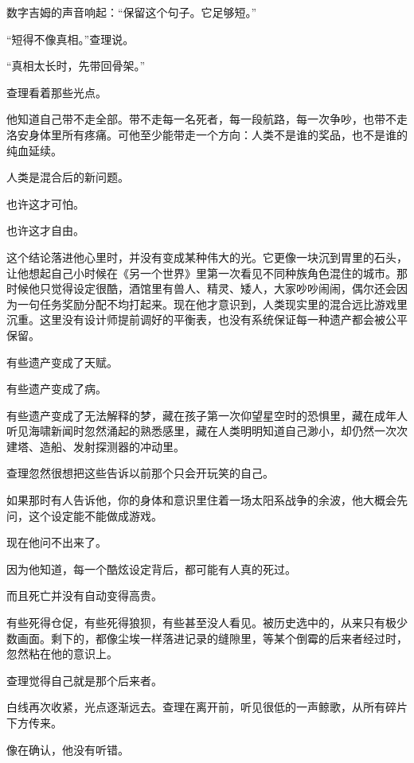 数字吉姆的声音响起：“保留这个句子。它足够短。”

“短得不像真相。”查理说。

“真相太长时，先带回骨架。”

查理看着那些光点。

他知道自己带不走全部。带不走每一名死者，每一段航路，每一次争吵，也带不走洛安身体里所有疼痛。可他至少能带走一个方向：人类不是谁的奖品，也不是谁的纯血延续。

人类是混合后的新问题。

也许这才可怕。

也许这才自由。

这个结论落进他心里时，并没有变成某种伟大的光。它更像一块沉到胃里的石头，让他想起自己小时候在《另一个世界》里第一次看见不同种族角色混住的城市。那时候他只觉得设定很酷，酒馆里有兽人、精灵、矮人，大家吵吵闹闹，偶尔还会因为一句任务奖励分配不均打起来。现在他才意识到，人类现实里的混合远比游戏里沉重。这里没有设计师提前调好的平衡表，也没有系统保证每一种遗产都会被公平保留。

有些遗产变成了天赋。

有些遗产变成了病。

有些遗产变成了无法解释的梦，藏在孩子第一次仰望星空时的恐惧里，藏在成年人听见海啸新闻时忽然涌起的熟悉感里，藏在人类明明知道自己渺小，却仍然一次次建塔、造船、发射探测器的冲动里。

查理忽然很想把这些告诉以前那个只会开玩笑的自己。

如果那时有人告诉他，你的身体和意识里住着一场太阳系战争的余波，他大概会先问，这个设定能不能做成游戏。

现在他问不出来了。

因为他知道，每一个酷炫设定背后，都可能有人真的死过。

而且死亡并没有自动变得高贵。

有些死得仓促，有些死得狼狈，有些甚至没人看见。被历史选中的，从来只有极少数画面。剩下的，都像尘埃一样落进记录的缝隙里，等某个倒霉的后来者经过时，忽然粘在他的意识上。

查理觉得自己就是那个后来者。

白线再次收紧，光点逐渐远去。查理在离开前，听见很低的一声鲸歌，从所有碎片下方传来。

像在确认，他没有听错。
